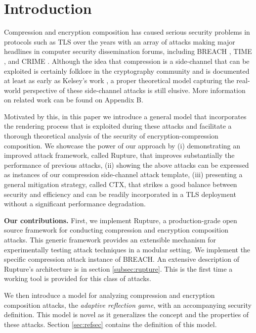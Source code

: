 \section{Introduction}\label{sec:prev}

Compression and encryption composition has caused serious security problems in
protocols such as TLS \cite{dierks2008tls} over the years with an array of
attacks making major headlines in computer security dissemination forums,
including BREACH \cite{gluck2013breach}, TIME \cite{be2013perfect}, and CRIME
\cite{duong2012crime}. Although the idea that compression is a side-channel that
can be exploited is certainly folklore in the cryptography community and is
documented at least as early as Kelsey's work \cite{kelsey2002compression}, a
proper theoretical model capturing the real-world perspective of these
side-channel attacks is still elusive. More information on related work can be
found on Appendix B.

Motivated by this, in this paper we introduce a general model that incorporates
the rendering process that is exploited during these attacks and facilitate a
thorough theoretical analysis of the security of encryption-compression
composition. We showcase the power of our approach by (i) demonstrating an
improved attack framework, called Rupture, that improves substantially the
performance of previous attacks, (ii) showing the above attacks can be expressed
as instances of our compression side-channel attack template, (iii) presenting a
general mitigation strategy, called CTX, that strikes a good balance between
security and efficiency and can be readily incorporated in a TLS deployment
without a significant performance degradation.

\noindent
\textbf{Our contributions.} First, we implement Rupture\footnotemark[1], a
production-grade open source framework for conducting compression and encryption
composition attacks. This generic framework provides an extensible mechanism
for experimentally testing attack techniques in a modular setting. We implement
the specific compression attack instance of BREACH. An extensive
description of Rupture's architecture is in section \ref{subsec:rupture}.
This is the first time a working tool is provided for this class of attacks.

We then introduce a model for analyzing compression and encryption composition
attacks, the \textit{adaptive reflection game}, with an accompanying security
definition. This model is novel as it generalizes the concept and the properties
of these attacks. Section \ref{sec:refsec} contains the definition of this
model.

